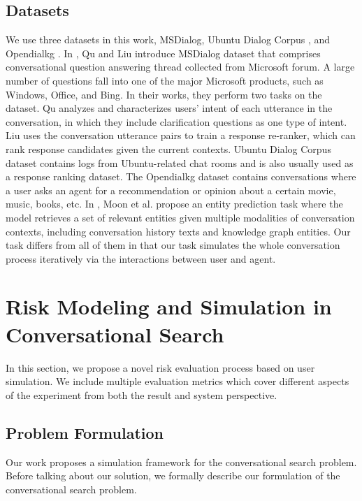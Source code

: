 \documentclass[format=acmsmall, review=False, screen=true]{acmart}
\begin{document}
\subsection{\textbf{Datasets}}
We use three datasets in this work, MSDialog, Ubuntu Dialog Corpus \cite{udcdataset}, and Opendialkg \cite{opendialkgdataset}. In \cite{msdialogintent, msdialogrank, msdialogintent2}, Qu and Liu introduce MSDialog dataset that comprises conversational question answering thread collected from Microsoft forum. A large number of questions fall into one of the major Microsoft products, such as Windows, Office, and Bing. In their works, they perform two tasks on the dataset. Qu \cite{msdialogintent, msdialogintent2} analyzes and characterizes users' intent of each utterance in the conversation, in which they include clarification questions as one type of intent. Liu \cite{msdialogrank} uses the conversation utterance pairs to train a response re-ranker, which can rank response candidates given the current contexts. Ubuntu Dialog Corpus dataset \cite{udcdataset} contains logs from Ubuntu-related chat rooms and is also usually used as a response ranking dataset. The Opendialkg dataset \cite{opendialkgdataset} contains conversations where a user asks an agent for a recommendation or opinion about a certain movie, music, books, etc. In \cite{opendialkgdataset}, Moon et al. propose an entity prediction task where the model retrieves a set of relevant entities given multiple modalities of conversation contexts, including conversation history texts and knowledge graph entities. Our task differs from all of them in that our task simulates the whole conversation process iteratively via the interactions between user and agent. 

\section{Risk Modeling and Simulation in Conversational Search}

In this section, we propose a novel risk evaluation process based on user simulation. We include multiple evaluation metrics which cover different aspects of the experiment from both the result and system perspective.

\subsection{Problem Formulation}

Our work proposes a simulation framework for the conversational search problem. Before talking about our solution, we formally describe our formulation of the conversational search problem. 
\end{document}

